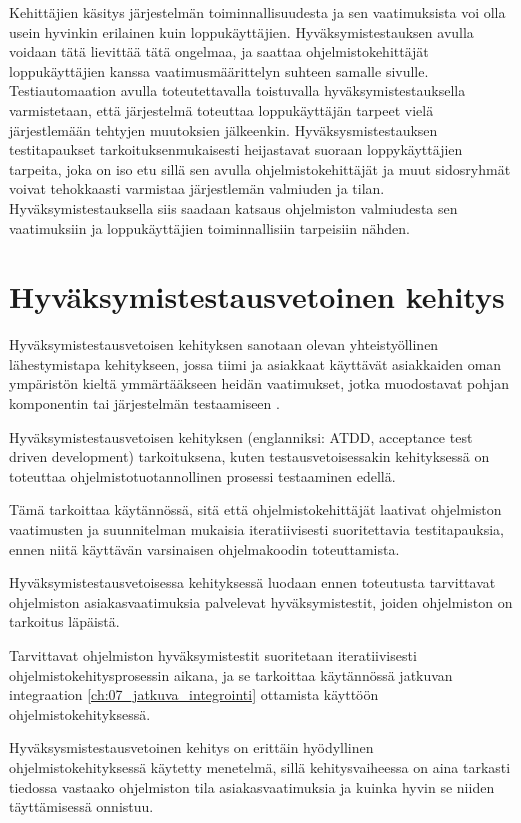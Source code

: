   Kehittäjien käsitys järjestelmän toiminnallisuudesta ja sen vaatimuksista voi olla usein hyvinkin erilainen kuin loppukäyttäjien.
  Hyväksymistestauksen avulla voidaan tätä lievittää tätä ongelmaa, ja saattaa ohjelmistokehittäjät loppukäyttäjien kanssa vaatimusmäärittelyn suhteen samalle sivulle.
  Testiautomaation avulla toteutettavalla toistuvalla hyväksymistestauksella varmistetaan, että järjestelmä toteuttaa loppukäyttäjän tarpeet vielä järjestlemään tehtyjen muutoksien jälkeenkin.
  Hyväksysmistestauksen testitapaukset tarkoituksenmukaisesti heijastavat suoraan loppykäyttäjien tarpeita, joka on iso etu sillä sen avulla ohjelmistokehittäjät ja muut sidosryhmät voivat tehokkaasti varmistaa järjestlemän valmiuden ja tilan.
  Hyväksymistestauksella siis saadaan katsaus ohjelmiston valmiudesta sen vaatimuksiin ja loppukäyttäjien toiminnallisiin tarpeisiin nähden.

\section{Hyväksymistestausvetoinen kehitys} \label{ch:08_hyvaksymistestausvetoinen_kehitys}

  Hyväksymistestausvetoisen kehityksen sanotaan olevan yhteistyöllinen lähestymistapa kehitykseen, jossa tiimi ja asiakkaat käyttävät asiakkaiden oman ympäristön kieltä ymmärtääkseen heidän vaatimukset, jotka muodostavat pohjan komponentin tai järjestelmän testaamiseen \parencite{istqb_glossary_nodate}.

  Hyväksymistestausvetoisen kehityksen (englanniksi: ATDD, acceptance test driven development) tarkoituksena, kuten testausvetoisessakin kehityksessä on toteuttaa ohjelmistotuotannollinen prosessi testaaminen edellä.

  Tämä tarkoittaa käytännössä, sitä että ohjelmistokehittäjät laativat ohjelmiston vaatimusten ja suunnitelman mukaisia iteratiivisesti suoritettavia testitapauksia, ennen niitä käyttävän varsinaisen ohjelmakoodin toteuttamista.

  Hyväksymistestausvetoisessa kehityksessä luodaan ennen toteutusta tarvittavat ohjelmiston asiakasvaatimuksia palvelevat hyväksymistestit, joiden ohjelmiston on tarkoitus läpäistä.

  Tarvittavat ohjelmiston hyväksymistestit suoritetaan iteratiivisesti ohjelmistokehitysprosessin aikana, ja se tarkoittaa käytännössä jatkuvan integraation \ref{ch:07_jatkuva_integrointi} ottamista käyttöön ohjelmistokehityksessä.

  Hyväksysmistestausvetoinen kehitys on erittäin hyödyllinen ohjelmistokehityksessä käytetty menetelmä, sillä kehitysvaiheessa on aina tarkasti tiedossa vastaako ohjelmiston tila asiakasvaatimuksia ja kuinka hyvin se niiden täyttämisessä onnistuu.

